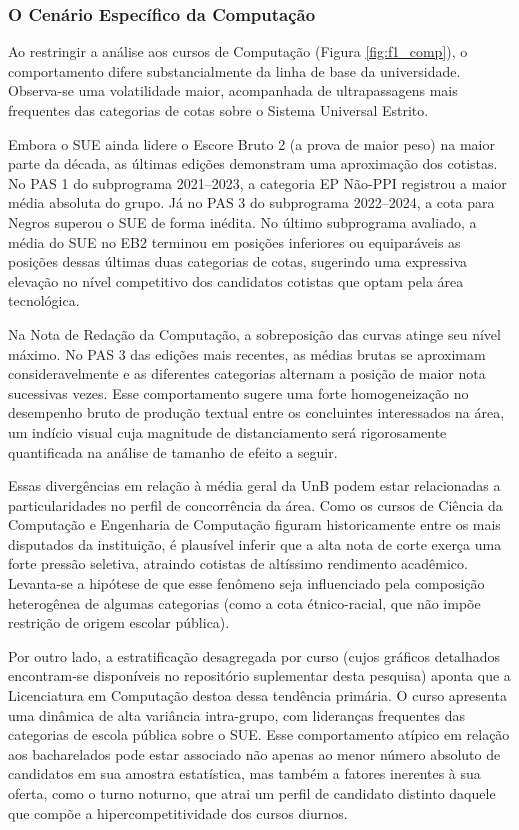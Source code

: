 \documentclass[12pt]{article}
\begin{document}
\subsubsection{O Cenário Específico da Computação}
Ao restringir a análise aos cursos de Computação (Figura \ref{fig:f1_comp}), o comportamento difere substancialmente da linha de base da universidade. Observa-se uma volatilidade maior, acompanhada de ultrapassagens mais frequentes das categorias de cotas sobre o Sistema Universal Estrito.

Embora o SUE ainda lidere o Escore Bruto 2 (a prova de maior peso) na maior parte da década, as últimas edições demonstram uma aproximação dos cotistas. No PAS 1 do subprograma 2021--2023, a categoria EP Não-PPI registrou a maior média absoluta do grupo. Já no PAS 3 do subprograma 2022--2024, a cota para Negros superou o SUE de forma inédita. No último subprograma avaliado, a média do SUE no EB2 terminou em posições inferiores ou equiparáveis as posições dessas últimas duas categorias de cotas, sugerindo uma expressiva elevação no nível competitivo dos candidatos cotistas que optam pela área tecnológica.

Na Nota de Redação da Computação, a sobreposição das curvas atinge seu nível máximo. No PAS 3 das edições mais recentes, as médias brutas se aproximam consideravelmente e as diferentes categorias alternam a posição de maior nota sucessivas vezes. Esse comportamento sugere uma forte homogeneização no desempenho bruto de produção textual entre os concluintes interessados na área, um indício visual cuja magnitude de distanciamento será rigorosamente quantificada na análise de tamanho de efeito a seguir.

Essas divergências em relação à média geral da UnB podem estar relacionadas a particularidades no perfil de concorrência da área. Como os cursos de Ciência da Computação e Engenharia de Computação figuram historicamente entre os mais disputados da instituição, é plausível inferir que a alta nota de corte exerça uma forte pressão seletiva, atraindo cotistas de altíssimo rendimento acadêmico. Levanta-se a hipótese de que esse fenômeno seja influenciado pela composição heterogênea de algumas categorias (como a cota étnico-racial, que não impõe restrição de origem escolar pública). 

Por outro lado, a estratificação desagregada por curso (cujos gráficos detalhados encontram-se disponíveis no repositório suplementar desta pesquisa) aponta que a Licenciatura em Computação destoa dessa tendência primária. O curso apresenta uma dinâmica de alta variância intra-grupo, com lideranças frequentes das categorias de escola pública sobre o SUE. Esse comportamento atípico em relação aos bacharelados pode estar associado não apenas ao menor número absoluto de candidatos em sua amostra estatística, mas também a fatores inerentes à sua oferta, como o turno noturno, que atrai um perfil de candidato distinto daquele que compõe a hipercompetitividade dos cursos diurnos.
\end{document}
